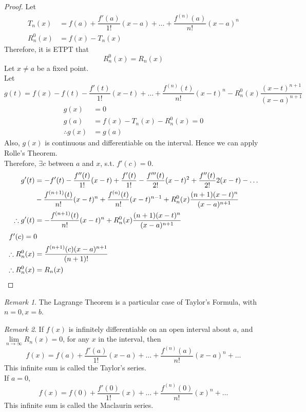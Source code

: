 \documentclass[fleqn]{article}
\theoremstyle{definition}
\theoremstyle{theorem}
\theoremstyle{remark}
\newtheorem{remark}{Remark}
\begin{document}
\begin{proof}
	Let 
	\begin{align*}
		T_n(x) &= f(a) + \dfrac{f'(a)}{1!} (x-a) + \dots + \dfrac{f^{(n)}(a)}{n!} (x-a)^n \\
		R_n^0 (x) &= f(x) - T_n(x)
	\end{align*}	
	Therefore, it is ETPT that 
	\begin{equation*}
		R_n^0 (x) = R_n (x)
	\end{equation*}
	Let $x \neq a$ be a fixed point. \\
	Let
	\begin{equation*}
		g(t) = f(x) - f(t) - \dfrac{f'(t)}{1!} (x-t) + \dots + \dfrac{f^{(n)}(t)}{n!} (x-t)^n - R_n^0 (x) \dfrac{(x-t)^{n+1}}{(x-a)^{n+1}}
	\end{equation*}
	\begin{align*}
		g(x) &= 0 \\
		g(a) &= f(x) - T_n(x) - R_n^0 (x) = 0 \\
		\therefore g(x) &= g(a) 
	\end{align*}
	Also, $g(x)$ is continuous and differentiable on the interval. Hence we can apply Rolle's Theorem.\\
	Therefore, $\exists c$ between $a$ and $x$, s.t. $f'(c) = 0$.
	\begin{align*}
		g'(t) &= -f'(t) - \dfrac{f''(t)}{1!} (x-t) + \dfrac{f'(t)}{1!} - \dfrac{f'''(t)}{2!} (x-t)^2 + \dfrac{f''(t)}{2!} 2(x-t) - \dots \\
		& - \dfrac{f^{(n+1)}(t)}{n!} (x-t)^n + \dfrac{f^{(n)}(t)}{n!} (x-t)^{n-1} + R_n^0 (x) \dfrac{(n+1)(x-t)^n}{(x-a)^{n+1}} \\
		\therefore g'(t) &= -\dfrac{f^{(n+1)}(t)}{n!} (x-t)^n + R_n^0 (x) \dfrac{(n+1)(x-t)^n}{(x-a)^{n+1}} \\
		\intertext{$f'(c) = 0$}
		\therefore R_n^0 (x) &= \dfrac{f^{(n+1)}(c) (x-a)^{n+1}}{(n+1)!} \\
		\therefore R_n^0 (x) &= R_n (x)
	\end{align*}
\end{proof}

\begin{remark}
	The Lagrange Theorem is a particular case of Taylor's Formula, with $n = 0, x = b$.
\end{remark}

\begin{remark}
	If $f(x)$ is infinitely differentiable on an open interval about $a$, and $\lim\limits_{n \to \infty} R_n(x) = 0$, for any $x$ in the interval, then
	\begin{equation*}
		f(x) = f(a) + \dfrac{f'(a)}{1!} (x-a) + \dots + \dfrac{f^{(n)}(a)}{n!} (x-a)^n + \dots
	\end{equation*}
	This infinite sum is called the Taylor's series.\\
	If $a = 0$, 
	\begin{equation*}
	f(x) = f(0) + \dfrac{f'(0)}{1!} (x) + \dots + \dfrac{f^{(n)}(0)}{n!} (x)^n + \dots
	\end{equation*}
	This infinite sum is called the Maclaurin series.
\end{remark}
\end{document}
